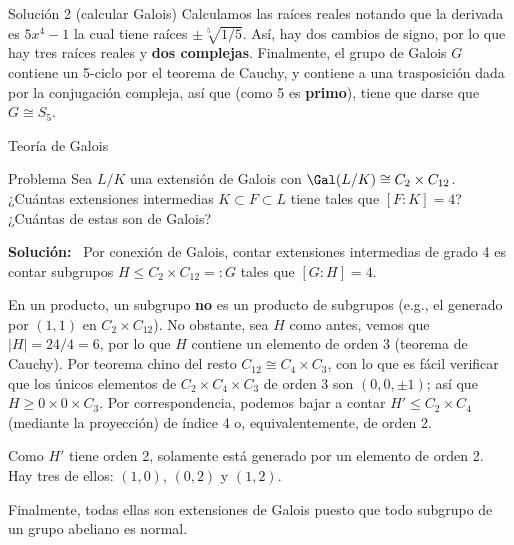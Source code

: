\documentclass[10pt]{beamer}
\newenvironment{sol}{\textbf{Solución:}\ }{}
\begin{document}
\begin{frame}{Solución 2 (calcular Galois)}
	Calculamos las raíces reales notando que la derivada es $5x^4 - 1$ la cual tiene raíces $\pm\sqrt[5]{1/5}$.
	\pause
	Así, hay dos cambios de signo, por lo que hay tres raíces reales y \textbf{dos complejas}.
	\pause
	Finalmente, el grupo de Galois $G$ contiene un 5-ciclo por el teorema de Cauchy, y contiene a una trasposición
	dada por la conjugación compleja, así que (como 5 es \textbf{primo}), tiene que darse que $G \cong S_5$.
\end{frame}

		

\begin{frame}{Teoría de Galois}
	\small
	\begin{block}{Problema}
		Sea $L/K$ una extensión de Galois con $\Gal(L/K) \cong C_2 \times C_{12}$.
		¿Cuántas extensiones intermedias $K \subset F \subset L$ tiene tales que $[F:K] = 4$?
		¿Cuántas de estas son de Galois?
	\end{block}
	\pause
	\begin{sol}
		Por conexión de Galois, contar extensiones intermedias de grado 4 es contar subgrupos $H \le C_2 \times
		C_{12} =: G$ tales que $[G : H] = 4$.

		\pause
		\warn
		En un producto, un subgrupo \textbf{no} es un producto de subgrupos (e.g., el generado por $(1,1)$ en
		$C_2 \times C_{12}$).
		\pause
		No obstante, sea $H$ como antes, vemos que $|H| = 24/4 = 6$, por lo que $H$ contiene un elemento de
		orden 3 (teorema de Cauchy).
		\pause
		Por teorema chino del resto $C_{12} \cong C_4\times C_3$, con lo que es fácil verificar que los únicos
		elementos de $C_2 \times C_4 \times C_3$ de orden 3 son $(0, 0, \pm 1)$;
		así que $H \ge 0 \times 0 \times C_3$.
		Por correspondencia, podemos bajar a contar $H' \le C_2 \times C_4$ (mediante la proyección) de índice
		4 o, equivalentemente, de orden 2.

		\pause
		Como $H'$ tiene orden 2, solamente está generado por un elemento de orden 2.
		Hay tres de ellos: $(1, 0)$, $(0, 2)$ y $(1, 2)$.

		\pause
		Finalmente, todas ellas son extensiones de Galois puesto que todo subgrupo de un grupo abeliano es
		normal.
	\end{sol}
\end{frame}
\end{document}
